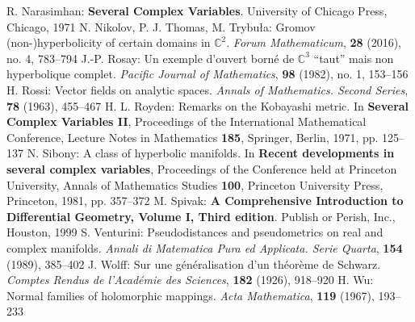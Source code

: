 \begin{thebibliography}{widest entry}
   R. Narasimhan: \textbf{Several Complex Variables}. University of Chicago Press, Chicago, 1971
   N. Nikolov, P. J. Thomas, M. Trybuła: Gromov (non-)hyperbolicity of certain domains in $\mathbb{C}^2$. \textit{Forum Mathematicum}, \textbf{28} (2016), no. 4, 783--794
   J.-P. Rosay: Un exemple d'ouvert borné de $\mathbb{C}^3$ ``taut'' mais non hyperbolique complet. \textit{Pacific Journal of Mathematics}, \textbf{98} (1982), no. 1, 153--156
   H. Rossi: Vector fields on analytic spaces. \textit{Annals of Mathematics. Second Series}, \textbf{78} (1963), 455--467
   H. L. Royden: Remarks on the Kobayashi metric. In \textbf{Several Complex Variables II}, Proceedings of the International Mathematical Conference, Lecture Notes in Mathematics \textbf{185}, Springer, Berlin, 1971, pp. 125--137
   N. Sibony: A class of hyperbolic manifolds. In \textbf{ Recent developments in several complex variables}, Proceedings of the Conference held at Princeton University, Annals of Mathematics Studies \textbf{100}, Princeton University Press, Princeton, 1981, pp. 357--372
   M. Spivak: \textbf{A Comprehensive Introduction to Differential Geometry, Volume I, Third edition}. Publish or Perish, Inc., Houston, 1999
   S. Venturini: Pseudodistances and pseudometrics on real and complex manifolds. \textit{Annali di Matematica Pura ed Applicata. Serie Quarta}, \textbf{154} (1989), 385--402
   J. Wolff: Sur une généralisation d'un théorème de Schwarz. \textit{Comptes Rendus de l'Académie des Sciences}, \textbf{182} (1926), 918--920
   H. Wu: Normal families of holomorphic mappings. \textit{Acta Mathematica}, \textbf{119} (1967), 193--233
\end{thebibliography}
